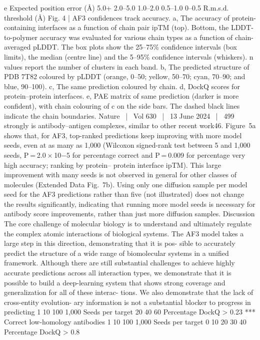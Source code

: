e
Expected position error (Å)
5.0+
2.0–5.0
1.0–2.0
0.5–1.0
0–0.5
R.m.s.d.
threshold (Å)
Fig. 4 | AF3 confidences track accuracy. a, The accuracy of protein-containing
interfaces as a function of chain pair ipTM (top). Bottom, the LDDT-to-polymer
accuracy was evaluated for various chain types as a function of chain-averaged
pLDDT. The box plots show the 25–75\% confidence intervals (box limits), the
median (centre line) and the 5–95\% confidence intervals (whiskers). n values
report the number of clusters in each band. b, The predicted structure of PDB
7T82 coloured by pLDDT (orange, 0–50; yellow, 50–70; cyan, 70–90; and
blue, 90–100). c, The same prediction coloured by chain. d, DockQ scores for
protein–protein interfaces. e, PAE matrix of same prediction (darker is more
confident), with chain colouring of c on the side bars. The dashed black lines
indicate the chain boundaries.
Nature  |  Vol 630  |  13 June 2024  |  499
strongly is antibody–antigen complexes, similar to other recent work46.
Figure 5a shows that, for AF3, top-ranked predictions keep improving
with more model seeds, even at as many as 1,000 (Wilcoxon signed-rank
test between 5 and 1,000 seeds, P = 2.0 × 10−5 for percentage correct
and P = 0.009 for percentage very high accuracy; ranking by protein–
protein interface ipTM). This large improvement with many seeds
is not observed in general for other classes of molecules (Extended
Data Fig. 7b). Using only one diffusion sample per model seed for the
AF3 predictions rather than five (not illustrated) does not change
the results significantly, indicating that running more model seeds
is necessary for antibody score improvements, rather than just more
diffusion samples.
Discussion
The core challenge of molecular biology is to understand and ultimately
regulate the complex atomic interactions of biological systems. The AF3
model takes a large step in this direction, demonstrating that it is pos-
sible to accurately predict the structure of a wide range of biomolecular
systems in a unified framework. Although there are still substantial
challenges to achieve highly accurate predictions across all interaction
types, we demonstrate that it is possible to build a deep-learning system
that shows strong coverage and generalization for all of these interac-
tions. We also demonstrate that the lack of cross-entity evolution-
ary information is not a substantial blocker to progress in predicting
1
10
100 1,000
Seeds per target
20
40
60
Percentage
DockQ > 0.23
***
Correct low-homology
antibodies
1
10
100 1,000
Seeds per target
0
10
20
30
40
Percentage
DockQ > 0.8
